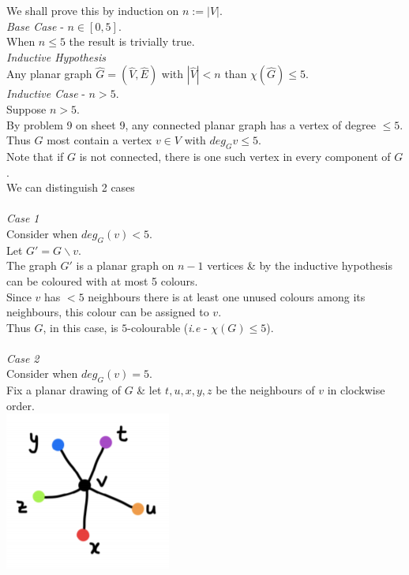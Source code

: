\documentclass[11pt,a4paper]{article}
\begin{document}
We shall prove this by induction on $n:=|V|$.\\
\textit{Base Case} - $n\in[0,5]$.\\
When $n\leq5$ the result is trivially true.\\
\textit{Inductive Hypothesis}\\
Any planar graph $\hat{G}=(\hat{V},\hat{E})$ with $|\hat{V}|<n$ than $\chi(\hat{G})\leq5$.\\
\textit{Inductive Case} - $n>5$.\\
Suppose $n>5$.\\
By problem 9 on sheet 9, any connected planar graph has a vertex of degree $\leq5$.\\
Thus $G$ most contain a vertex $v\in V$ with $deg_Gv\leq5$.\\
Note that if $G$ is not connected, there is one such vertex in every component of $G$.\\
We can distinguish 2 cases\\
\\
\textit{Case 1}\\
Consider when $deg_G(v)<5$.\\
Let $G'=G\backslash v$.\\
The graph $G'$ is a planar graph on $n-1$ vertices \& by the inductive hypothesis can be coloured with at most 5 colours.\\
Since $v$ has $<5$ neighbours there is at least one unused colours among its neighbours, this colour can be assigned to $v$.\\
Thus $G$, in this case, is $5$-colourable (\textit{i.e} - $\chi(G)\leq5$).\\
\\
\textit{Case 2}\\
Consider when $deg_G(v)=5$.\\
Fix a planar drawing of $G$ \& let $t,u,x,y,z$ be the neighbours of $v$ in clockwise order.\\
\includegraphics[scale=0.5]{img/5proof1.png}\\
\end{document}
